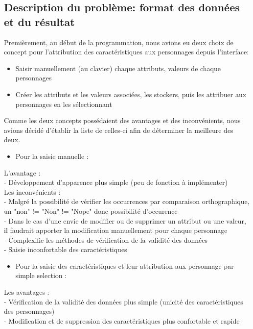 \documentclass[a4paper]{article}
\begin{document}
 \subsection{Description du problème: format des données et du résultat}
 Premièrement, au début de la programmation, nous avions eu deux choix de concept pour l'attribution des caractéristiques aux personnages depuis l'interface:
 \begin{itemize}
 \item {Saisir manuellement (au clavier) chaque attributs, valeurs de chaque personnages}
 \item {Créer les attributs et les valeurs associées, les stockers, puis les attribuer aux personnages en les sélectionnant} 
 \end{itemize}
 Comme les deux concepts possédaient des avantages et des inconvénients, nous avions décidé d'établir la liste de celles-ci afin de déterminer la meilleure des deux.
 \begin{itemize}
 \item {Pour la saisie manuelle :}
 \end{itemize}
 
 L'avantage :\\  
   - Développement d'apparence plus simple (peu de fonction à implémenter)\\
 
 Les inconvénients :\\
   - Malgré la possibilité de vérifier les occurrences par comparaison orthographique, un "non" != "Non" != "Nope" donc possibilité d'occurence\\
   - Dans le cas d'une envie de modifier ou de supprimer un attribut ou une valeur, il faudrait apporter la modification manuellement pour chaque personnage\\
   - Complexifie les méthodes de vérification de la validité des données\\
   - Saisie inconfortable des caractéristiques
 \begin{itemize}
 \item {Pour la saisie des caractéristiques et leur attribution aux personnage par simple selection :}
 \end{itemize}
 
 Les avantages :\\
 - Vérification de la validité des données plus simple (unicité des caractéristiques des personnages)\\
 - Modification et de suppression des caractéristiques plus confortable et rapide\\
 
\end{document}

